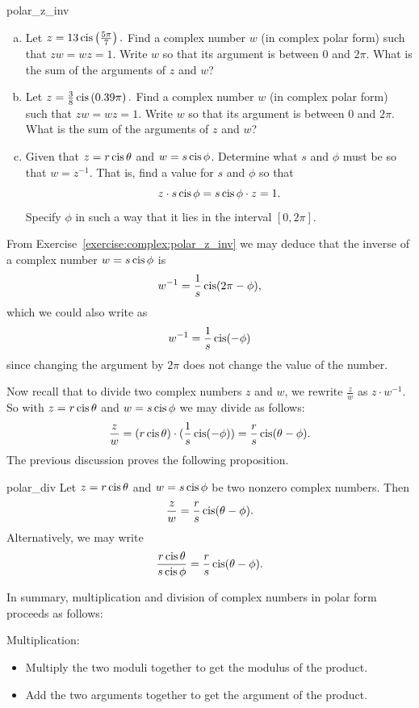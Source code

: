 {\begin{exercise}{polar_z_inv}
\begin{enumerate}[(a)]
\item
Let $z = 13 \operatorname{cis}\left(\frac{5\pi}{7}\right).$ Find a complex number $w$ (in complex polar form) such that $zw = wz = 1$. Write $w$ so that its argument is between $0$ and $2\pi$. What is the sum of the arguments of $z$ and $w$?
\item
Let $z = \frac{3}{8} \operatorname{cis}\left(0.39\pi\right).$ Find a complex number $w$ (in complex polar form) such that $zw = wz = 1$. Write $w$ so that its argument is between $0$ and $2\pi$. What is the sum of the arguments of $z$ and $w$?
\item
Given that $z=r\operatorname{cis}\theta$ and $w=s\operatorname{cis}\phi$.  Determine what $s$ and $\phi$ must be so that $w = z^{-1}$.  That is, find a value for $s$ and $\phi$ so that 
\[ z \cdot s\operatorname{cis}\phi = s\operatorname{cis}\phi \cdot z = 1.\]
Specify $\phi$ in such a way that it lies in the interval $[0,2\pi]$.
\end{enumerate}
\end{exercise}


\medskip{}
\noindent
From Exercise~\ref{exercise:complex:polar_z_inv} we may deduce that the inverse of a complex number $w = s \operatorname{cis} \phi$ is
\[ w^{-1} = \frac{1}{s}\operatorname{cis}(2\pi -\phi), \]
which we could also write as
\[ w^{-1} = \frac{1}{s}\operatorname{cis}(-\phi) \]
since changing the argument by $2\pi$ does not change the value of the number.

Now recall that to divide two complex numbers $z$ and $w$, we rewrite $\frac{z}{w}$ as $z \cdot w^{-1}$.  
So with $z=r\operatorname{cis}\theta$ and $w=s\operatorname{cis}\phi$ we may divide as follows:  
\[ \frac{z}{w} = (r\operatorname{cis}\theta) \cdot (\frac{1}{s}\operatorname{cis}(-\phi)) = \frac{r}{s}\operatorname{cis}(\theta - \phi). \]
The previous discussion proves the following proposition.

\begin{prop}{polar_div}
Let $z=r\operatorname{cis}\theta$ and $w=s\operatorname{cis}\phi$ be two nonzero complex numbers. Then
 \[ \frac{z}{w} = \frac{r}{s}\operatorname{cis}(\theta - \phi).\]
 Alternatively, we may write
 \[ \frac{r \operatorname{cis} \theta}{s \operatorname{cis} \phi} = \frac{r}{s}\operatorname{cis}(\theta - \phi).\]
 \end{prop}

\noindent
In summary, multiplication and division of complex numbers in polar form proceeds as follows:

\medskip{}
\noindent
Multiplication:
\begin{itemize}
\item
Multiply the two moduli together to get the modulus of the product.
\item
Add the two arguments together to get the argument of the product.
\end{itemize}

}
